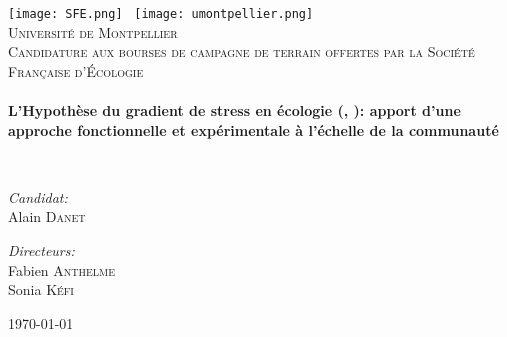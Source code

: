 \begin{titlepage}
\begin{center}

\texttt{[image: SFE.png]}~ \hfill \texttt{[image: umontpellier.png]}~\\[1cm]

\textsc{\LARGE Université de Montpellier}\\[1.5cm]

\textsc{\large Candidature aux bourses de campagne de terrain offertes par la 
Société Française d'Écologie}\\[0.5cm]

\HRule \\[0.4cm]
{ \Large \bfseries  L'Hypothèse du gradient de stress en écologie (\citeauthor{Bertness1994}, \citeyear{Bertness1994}): apport d'une approche fonctionnelle et expérimentale à l'échelle de la communauté \\[0.4cm] }

\HRule \\[1.5cm]

\noindent
\begin{minipage}{0.4\textwidth}
\begin{flushleft} \large
\emph{Candidat:}\\
Alain \textsc{Danet}
\end{flushleft}
\end{minipage}%
\begin{minipage}{0.4\textwidth}
\begin{flushright} \large
\emph{Directeurs:} \\
Fabien \textsc{Anthelme} \\[0.0cm]
Sonia \textsc{Kéfi}
\end{flushright}
\end{minipage}

\vfill

{\large \today}

\end{center}
\end{titlepage}